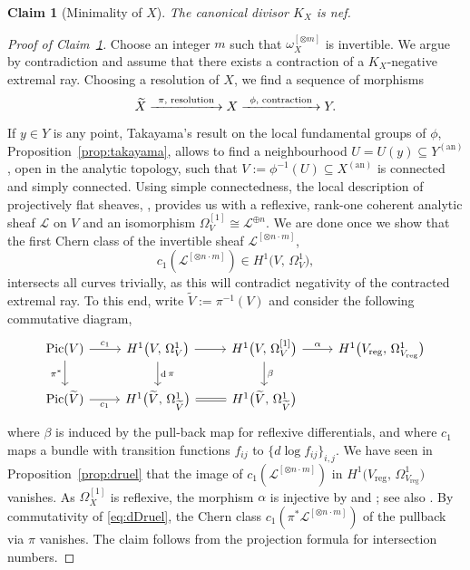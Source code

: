 \documentclass[JEP,XML,SOM,Unicode,published]{cedram}
\let\scr\mathscr
\newcommand{\To}[1]{\mathchoice{\xrightarrow{\ts\kern4pt#1\kern3pt}}{\stackrel{#1}{\longrightarrow}}{}{}}
\let\ts\relax
\newcommand{\an}{\mathrm{an}}
\theoremstyle{plain}
\newtheorem{claim}[thm]{Claim}
\theoremstyle{definition}
\numberwithin{equation}{thm}
\numberwithin{enumi}{thm}
\DeclareMathOperator{\Pic}{Pic}
\newcommand{\reg}{\mathrm{reg}}
\DeclareMathOperator{\diff}{d}
\newcommand{\sL}{\scr{L}}
\let\wtilde\widetilde
\begin{document}
\begin{claim}[Minimality of $X$]\label{claim:minimal}
The canonical divisor $K_X$ is nef.
\end{claim}
\begin{proof}[Proof of Claim~\ref{claim:minimal}]
Choose an integer $m$ such that $\omega^{[\otimes m]}_X$ is invertible. We argue by
contradiction and assume that there exists a contraction of a $K_X$-negative
extremal ray. Choosing a resolution of $X$, we find a sequence of morphisms
\[
\wtilde{X} \To{\pi\text{, resolution}} X \To{\phi\text{, contraction}}Y.
\]
If $y \in Y$ is any point, Takayama's result on the local fundamental groups of
$\phi$, Proposition~\ref{prop:takayama}, allows to find a neighbourhood
$U = U(y) \subseteq Y^{(\an)}$, open in the analytic topology, such that
$V := \phi^{-1}(U) \subseteq X^{(\an)}$ is connected and simply connected. Using simple
connectedness, the local description of projectively flat sheaves,
\cite[Prop.\,3.11]{GKP20a}, provides us with a reflexive, rank-one coherent
analytic sheaf $\sL$ on $V$ and an isomorphism $\Omega^{[1]}_V \cong \sL^{\oplus n}$. We are
done once we show that the first Chern class of the invertible sheaf
$\sL^{[\otimes n\cdot m]}$,
\[
c_1(\sL^{[\otimes n\cdot m]}) \in H^1\bigl(V,\, \Omega^1_V \bigr),
\]
intersects all curves trivially, as this will contradict negativity of the
contracted extremal ray. To this end, write $\wtilde{V} := \pi^{-1}(V)$ and
consider the following commutative diagram,
\begin{equation}\label{eq:dDruel}
\begin{tikzcd}
\Pic(V) \ar[r, "\ts c_1"] \ar[d, "\ts \pi^*"'] & H^1\bigl(V,\, \Omega^1_V \bigr) \ar[r] \ar[d, "\ts \diff\pi"] & H^1\bigl(V,\, \Omega^{[1]}_V \bigr) \ar[r, "\ts \alpha"] \ar[d, "\ts\beta"] & H^1\bigl(V_{\reg},\, \Omega^1_{V_{\reg}} \bigr) \\
\Pic(\wtilde{V}) \ar[r, "\ts c_1"'] & H^1\bigl(\wtilde{V},\, \Omega^1_{\wtilde{V}} \bigr) \ar[r, equal] & H^1\bigl(\wtilde{V},\, \Omega^1_{\wtilde{V}} \bigr)
\end{tikzcd}
\end{equation}
where $\beta$ is induced by the pull-back map for reflexive differentials, and
where $c_1$ maps a bundle with transition functions $f_{ij}$ to
$\{d \log f_{ij}\}_{i,j}$. We have seen in Proposition~\ref{prop:druel} that
the image of $c_1(\sL^{[\otimes n\cdot m]})$ in $H^1\bigl(V_{\reg},\, \Omega^1_{V_{\reg}} \bigr)$
vanishes. As $\Omega^{[1]}_X$ is reflexive, the morphism $\alpha$ is injective by
\cite[Th.\,1.14]{MR0287033} and \cite[Cor.\,II.3.15]{BS76}; see also
\cite[Th.\,II.3.6]{BS76}. By commutativity of \eqref{eq:dDruel}, the Chern
class $c_1(\pi^* \sL^{[\otimes n\cdot m]})$ of the pullback via $\pi$ vanishes. The claim
follows from the projection formula for intersection numbers.
\end{proof}
\end{document}
